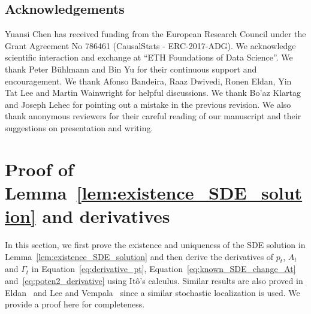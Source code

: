 \documentclass[11pt,twoside]{article}
\newcommand{\potentwo}{\Gamma}
\theoremstyle{named}
\theoremstyle{plain}
\begin{document}



\subsection*{Acknowledgements}
Yuansi Chen has received funding from the European Research Council under
the Grant Agreement No 786461 (CausalStats - ERC-2017-ADG). We acknowledge
scientific interaction and exchange at ``ETH Foundations of Data Science''. We thank Peter B\"uhlmann and Bin Yu for their continuous support and encouragement. We thank Afonso Bandeira, Raaz Dwivedi, Ronen Eldan, Yin Tat Lee and Martin Wainwright for helpful discussions. We thank Bo'az Klartag and Joseph Lehec for pointing out a mistake in the previous revision. We also thank anonymous reviewers for their careful reading of our manuscript and their suggestions on presentation and writing.

\appendix

\section{Proof of Lemma~\ref{lem:existence_SDE_solution} and derivatives} %
\label{sec:proof_of_derivatives}
In this section, we first prove the existence and uniqueness of the SDE solution in Lemma~\ref{lem:existence_SDE_solution} and then derive the derivatives of $p_t$, $A_t$ and $\potentwo_t$ in Equation~\eqref{eq:derivative_pt}, Equation~\eqref{eq:known_SDE_change_At} and~\eqref{eq:poten2_derivative} using It\^o's calculus. Similar results are also proved in Eldan~\cite{eldan2013thin} and Lee and Vempala~\cite{lee2016eldan} since a similar stochastic localization is used. We provide a proof here for completeness.
\end{document}
